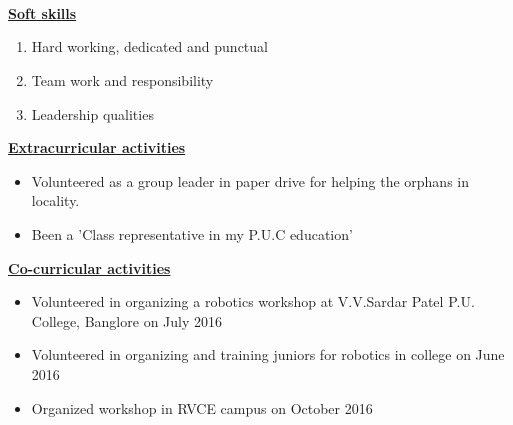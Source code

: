 \documentclass[10pt]{article}
\begin{document}
	\hfill\\
	\\ \\
	
	\underline{\textbf{\Large{Soft skills}}}
	\begin{enumerate}
		\item{Hard working, dedicated and punctual}
		\item{Team work and responsibility}
		\item{Leadership qualities} 
		
	\end{enumerate}

	\hfill
	
	\underline{\textbf{\Large{Extracurricular activities}}}
	\begin{itemize}
		\item{Volunteered as a group leader in paper drive for helping the orphans in locality.}
		\item{Been a 'Class representative in my P.U.C education'}
	\end{itemize}

	\underline{\textbf{\Large{Co-curricular activities}}}
	\begin{itemize}
		\item{Volunteered in organizing a robotics workshop at V.V.Sardar Patel P.U. College, Banglore on July 2016}
		\item{Volunteered in organizing and training juniors for robotics in college on June 2016}
		\item{Organized workshop in RVCE campus on October 2016}
		
	\end{itemize}
	\hfill
\end{document}
